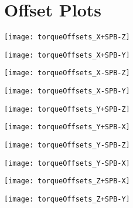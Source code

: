 
\chapter{Offset Plots}

\texttt{[image: torqueOffsets\_X+SPB-Z]}

\texttt{[image: torqueOffsets\_X+SPB-Y]}


\texttt{[image: torqueOffsets\_X-SPB-Z]}

\texttt{[image: torqueOffsets\_X-SPB-Y]}


\texttt{[image: torqueOffsets\_Y+SPB-Z]}

\texttt{[image: torqueOffsets\_Y+SPB-X]}


\texttt{[image: torqueOffsets\_Y-SPB-Z]}

\texttt{[image: torqueOffsets\_Y-SPB-X]}


\texttt{[image: torqueOffsets\_Z+SPB-X]}

\texttt{[image: torqueOffsets\_Z+SPB-Y]}

